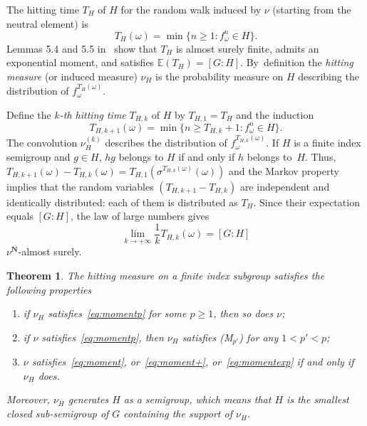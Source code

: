 \documentclass[JEP,XML,SOM,Unicode,published]{cedram}
\let\sep :
\newcommand{\aset}[1]{\{#1\}}
\newcommand{\bset}[1]{\bigl\{#1\bigr\}}
\newcommand{\ee}{\mathbb{E}}
\def\N{\mathbf{N}}
\theoremstyle{plain}
\newtheorem{thm}{Theorem}[section]
\theoremstyle{definition}
\begin{document}
The hitting time $T_{H}$ of $H$ for the random walk
induced by $\nu$ (starting from the neutral element) is
\begin{equation*}
T_H(\omega) = \min\bset {n\geq 1\sep f^n_\omega \in H}.
\end{equation*}
Lemmas 5.4 and 5.5 in~\cite{benoist-quint_book} show that $T_H$ is almost surely finite,
admits an exponential moment, and satisfies $\ee(T_{H}) = [G:H]$. By~definition the \emph{hitting measure} (or induced measure)
$\nu_H$ is the probability measure on $H$ describing the distribution of $f^{T_{H}(\omega)}_\omega$.

Define the \emph{$k$-th hitting time} $T_{H,k}$ of $H$ by $T_{H,1}=T_H$ and the induction\vspace*{-3pt}
\begin{equation*}
T_{H,k+1}(\omega) = \min\aset{n\geq T_{H,k}+1\sep  f_\omega^{n} \in H}.
\end{equation*}
The convolution $\nu_H^{(k)}$ describes the distribution
of $f^{T_{H,k}(\omega)}_\omega$.
If $H$ is a finite index semigroup and $g\in H$, $hg$ belongs to $H$ if and only if $h$ belongs to~$H$. Thus,
$T_{H, k+1}(\omega) - T_{H, k}(\omega) = T_{H, 1}(\sigma^{T_{H, k}(\omega)}(\omega))$ and the Markov property implies that the random variables $(T_{H, k+1} - T_{H, k})$ are independent and identically distributed: each of them is distributed as $T_H$. Since their expectation equals $[G:H]$,
the law of large numbers gives\vspace*{-3pt}\enlargethispage{.6\baselineskip}
\begin{equation*}\label{eq:limit_kth_hitting_time}
\lim_{k\to+\infty} \frac{1}{k}T_{H, k}(\omega)=[G:H]
\end{equation*} $\nu^\N$-almost surely.

\begin{thm}\label{thm:M$_2$} The hitting measure on a finite index subgroup satisfies the following properties
\begin{enumerate}
\item\label{thm:M$_2$1} if $\nu_H$ satisfies~\eqref{eq:momentp} for some $p\geq 1$, then so does $\nu$;
\item\label{thm:M$_2$2} if $\nu$ satisfies~\eqref{eq:momentp}, then $\nu_H$ satisfies (M$_{p'}$) for any $1 < p' < p$;
\item\label{thm:M$_2$3} $\nu$ satisfies~\eqref{eq:moment}, or~\eqref{eq:moment+}, or~\eqref{eq:momentexp} if and only if $\nu_H$ does.
\end{enumerate}
Moreover, $\nu_H$ generates $H$ as a semigroup, which means that $H$ is the smallest closed sub-semigroup of $G$ containing the support of $\nu_H$.
\end{thm}
\end{document}
